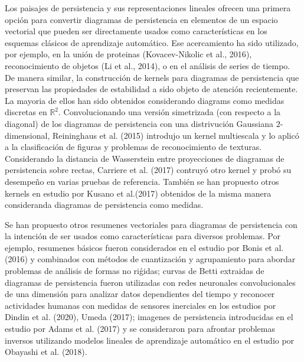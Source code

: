 Los paisajes de persistencia y sus representaciones lineales ofrecen una primera opci\'on
para convertir diagramas de persistencia en elementos de un espacio vectorial que pueden ser
directamente usados  como caracter\'isticas en los esquemas cl\'asicos de
aprendizaje autom\'atico.
Ese acercamiento ha sido utilizado, por ejemplo, en la uni\'on de proteinas
(Kovacev-Nikolic et al., 2016\cite{Kovacev2016}), reconocimiento de objetos
(Li et al., 2014\cite{Li2014}), o en el an\'alisis de series de tiempo.
De manera similar, la construcci\'on de kernels para diagramas de persistencia
que preservan las propiedades de estabilidad a sido objeto de atenci\'on recientemente.
La mayoria de ellos han sido obtenidos considerando diagrams como medidas discretas en
$\mathbb{R}^{2}$.
Convolucionando una versi\'on simetrizada (con respecto a la diagonal)
de los diagramas de persistencia con una distrivuci\'on Gaussiana $2$-dimensional,
Reininghaus et al. (2015)\cite{Reini2015} introdujo un kernel multiescala y lo aplic\'o
a la clasificaci\'on de figuras y problemas de reconocimiento de texturas.
Considerando la distancia de Wasserstein entre proyecciones de diagramas de persistencia
sobre rectas, Carriere et al. (2017)\cite{Carriere2017} contruy\'o otro kernel y prob\'o
su desempe\~{n}o en varias pruebas de referencia.
Tambi\'en se han  propuesto otros kernels en estudio por Kusano et al.(2017)\cite{Kusano2017}
obtenidos de la misma manera consideranda diagramas de persistencia como medidas.

Se han propuesto otros resumenes vectoriales para diagramas de persistencia
con la intenci\'on de ser usados como caracter\'isticas para diversos problemas.
Por ejemplo, resumenes b\'asicos fueron considerados en el estudio por
Bonis et al. (2016)\cite{Bonis2016} y combinados con m\'etodos de cuantizaci\'on y
agrupamiento para abordar problemas de an\'alisis de formas no ri\'gidas;
curvas de Betti extraidas de diagramas de persistencia fueron utilizadas con
redes neuronales convolucionales de una dimensi\'on para analizar datos dependientes del
tiempo y reconocer actividades humanas con medidas de sensores inerciales en los estudios por
Dindin et al. (2020)\cite{Dindin2017}, Umeda (2017)\cite{Umeda2017};
imagenes de persistencia introducidas en el estudio por Adams et al. (2017)\cite{Adams2017}
y se consideraron para  afrontar problemas inversos utilizando
modelos lineales de aprendizaje autom\'atico
en el estudio por Obayashi et al. (2018)\cite{Obay2018}.


